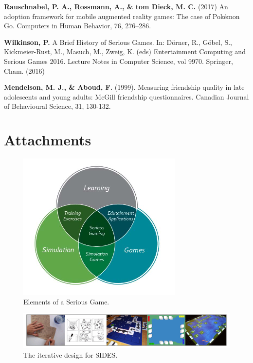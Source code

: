 \documentclass[runningheads]{llncs}
\begin{document}
\begin{thebibliography}{8}
 \textbf{Rauschnabel, P. A., Rossmann, A., \& tom Dieck, M. C.} (2017) An adoption framework for mobile augmented reality games: The case of Pokémon Go. Computers in Human Behavior, 76, 276–286. 

 \textbf{Wilkinson, P.} A Brief History of Serious Games. In: Dörner, R., Göbel, S., Kickmeier-Rust, M., Masuch, M., Zweig, K. (eds) Entertainment Computing and Serious Games 2016. Lecture Notes in Computer Science, vol 9970. Springer, Cham. (2016) 

 \textbf{Mendelson, M. J., \& Aboud, F.} (1999). Measuring friendship quality in late adolescents and young adults: McGill friendship questionnaires. Canadian Journal of Behavioural Science, 31, 130-132. 

\end{thebibliography}

\newpage
\section{Attachments}

\begin{figure}
    \centering
    \includegraphics[scale = 1]{seriousgame.png}
    \caption{Elements of a Serious Game. \cite{ref_article13}}
    \label{fig:SeriousGame}
\end{figure}

\begin{figure}
    \centering
    \includegraphics[scale = 0.6]{SIDES.png}
    \caption{The iterative design for SIDES. \cite{ref_proc1}}
    \label{fig:SIDES}
\end{figure}
\end{document}
